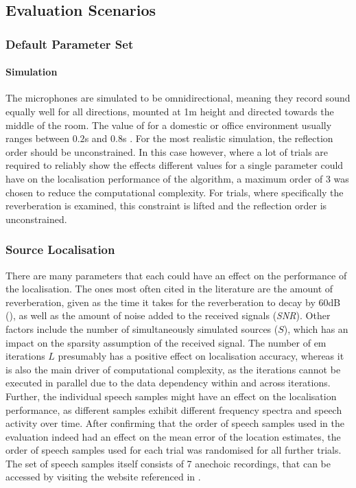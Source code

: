 \subsection{Evaluation Scenarios}
\subsubsection{Default Parameter Set}

\paragraph{Simulation}
The microphones are simulated to be omnidirectional, meaning they record sound equally well for all directions, mounted at 1m height and directed towards the middle of the room. The value of \Tsixty for a domestic or office environment usually ranges between $0.2$s and $0.8$s \cite[p.695]{Gannot2017}. For the most realistic simulation, the reflection order should be unconstrained. In this case however, where a lot of trials are required to reliably show the effects different values for a single parameter could have on the localisation performance of the algorithm, a maximum order of 3 was chosen to reduce the computational complexity. For trials, where specifically the reverberation is examined, this constraint is lifted and the reflection order is unconstrained.

\subsubsection{Source Localisation}
There are many parameters that each could have an effect on the performance of the localisation. The ones most often cited in the literature are the amount of reverberation, given as the time it takes for the reverberation to decay by 60dB (\Tsixty), as well as the amount of noise added to the received signals (\emph{SNR}). Other factors include the number of simultaneously simulated sources ($S$), which has an impact on the sparsity assumption of the received signal. The number of \gls{em} iterations $L$ presumably has a positive effect on localisation accuracy, whereas it is also the main driver of computational complexity, as the iterations cannot be executed in parallel due to the data dependency within and across iterations. Further, the individual speech samples might have an effect on the localisation performance, as different samples exhibit different frequency spectra and speech activity over time. After confirming that the order of speech samples used in the evaluation indeed had an effect on the mean error of the location estimates, the order of speech samples used for each trial was randomised for all further trials. The set of speech samples itself consists of 7 anechoic recordings, that can be accessed by visiting the website referenced in \cite{Mainczyk2017}.


